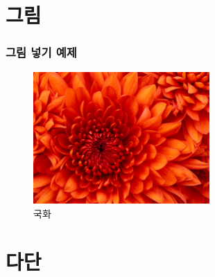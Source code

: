 \documentclass[10pt,xcolor=pdftex,dvipsnames,table,handout]{beamer}
\begin{document}
		\section{그림}
		\begin{frame}
		\frametitle{그림 넣기 예제}
			\begin{figure}
			\includegraphics[scale=1.0,width=0.6\textwidth]{./fig/Chrysanthemum.jpg}
			\caption{국화}
			\end{figure}
		\end{frame}







		\section{다단}
\end{document}
